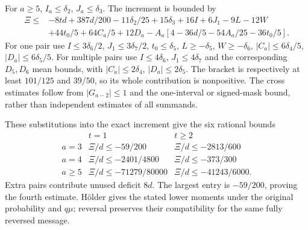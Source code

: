 For $a\ge5$, $I_a\le \delta_{2}$, $J_a\le \delta_{3}$.
The increment is bounded by
\begin{align*}
 \Xi\le{}&-8td+387d/200-11\delta_{2}/25+15\delta_{3}+16I+6J_1-9L-12W\\
 &+44t_0/5+64C_a/5+12D_a
 -A_a[4-36d/5-54A_a/25-36t_0/5].
\end{align*}
For one pair use $I\le3\delta_{6}/2$, $J_1\le3\delta_{7}/2$,
$t_0\le \delta_{5}$, $L\ge-\delta_{5}$, $W\ge-\delta_{6}$,
$|C_a|\le6\delta_{4}/5$, $|D_a|\le6\delta_{5}/5$.
For multiple pairs use $I\le4\delta_{6}$, $J_1\le4\delta_{7}$ and the corresponding
$D_5,D_6$ mean bounds, with $|C_a|\le2\delta_{4}$, $|D_a|\le2\delta_{5}$.
The bracket is respectively at least $101/125$ and $39/50$,
so its whole contribution is nonpositive.
The cross estimates follow from $|G_{a-2}|\le1$ and the one-interval
or signed-mask bound, rather than independent estimates of all summands.

These substitutions into the exact increment give the six rational bounds
\[
 \begin{array}{c|cc}
 &t=1&t\ge2\\\hline
 a=3&\Xi/d\le-59/200&\Xi/d\le-2813/600\\
 a=4&\Xi/d\le-2401/4800&\Xi/d\le-373/300\\
 a\ge5&\Xi/d\le-71279/80000&\Xi/d\le-41243/6000.
 \end{array}
\]
Extra pairs contribute unused deficit $8d$. The largest entry is
$-59/200$, proving the fourth estimate. H\"older gives the stated lower
moments under the original probability and $q\mu$; reversal preserves
their compatibility for the same fully reversed message.

